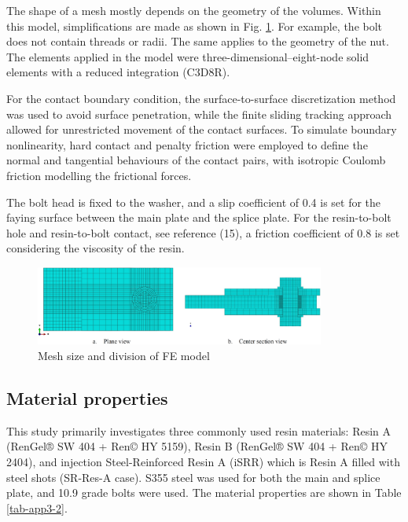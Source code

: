 The shape of a mesh mostly depends on the geometry of the volumes. Within this model, simplifications are made as shown in Fig. \ref{fig-mesh-div-RIBJ}. For example, the bolt does not contain threads or radii. The same applies to the geometry of the nut. The elements applied in the model were three-dimensional--eight-node solid elements with a reduced integration (C3D8R). 

For the contact boundary condition, the surface-to-surface discretization method was used to avoid surface penetration, while the finite sliding tracking approach allowed for unrestricted movement of the contact surfaces. To simulate boundary nonlinearity, hard contact and penalty friction were employed to define the normal and tangential behaviours of the contact pairs, with isotropic Coulomb friction modelling the frictional forces.

The bolt head is fixed to the washer, and a slip coefficient of 0.4 is set for the faying surface between the main plate and the splice plate. For the resin-to-bolt hole and resin-to-bolt contact, see reference (15), a friction coefficient of 0.8 is set considering the viscosity of the resin.

\begin{figure}
    \centering
    \includegraphics[width=0.85\textwidth]{imgs/app3/mesh-div-RIBJ.png}
    \caption{Mesh size and division of FE model}
    \label{fig-mesh-div-RIBJ}
\end{figure}

\subsection{Material properties}

This study primarily investigates three commonly used resin materials: Resin A (RenGel® SW 404 + Ren© HY 5159), Resin B (RenGel® SW 404 + Ren© HY 2404), and injection Steel-Reinforced Resin A (iSRR) which is Resin A filled with steel shots (SR-Res-A case). S355 steel was used for both the main and splice plate, and 10.9 grade bolts were used. The material properties are shown in Table \ref{tab-app3-2}.

